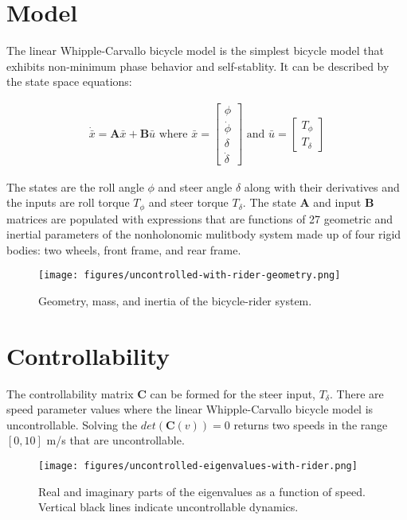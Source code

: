 \documentclass[12pt]{article}
\begin{document}
\section{Model}

The linear Whipple-Carvallo bicycle model
\cite{Whipple1899a,Carvallo1899,Meijaard2007} is the simplest bicycle model
that exhibits non-minimum phase behavior and self-stablity. It can be described
by the state space equations:

\begin{align}
  \dot{\bar{x}} = \mathbf{A} \bar{x} + \mathbf{B} \bar{u}
  \textrm{ where }
  \bar{x} = \begin{bmatrix} \phi \\ \dot{\phi} \\ \delta \\ \dot{\delta} \end{bmatrix}
  \textrm{ and }
  \bar{u} = \begin{bmatrix} T_{\phi} \\ T_{\delta} \end{bmatrix}
\end{align}

The states are the roll angle \(\phi\) and steer angle \(\delta\) along with
their derivatives and the inputs are roll torque \(T_\phi\) and steer torque
\(T_\delta\). The state \(\mathbf{A}\) and input \(\mathbf{B}\) matrices are
populated with expressions that are functions of 27 geometric and inertial
parameters of the nonholonomic mulitbody system made up of four rigid bodies:
two wheels, front frame, and rear frame.

\begin{figure}
  \centering
  \texttt{[image: figures/uncontrolled-with-rider-geometry.png]}
  \caption{Geometry, mass, and inertia of the bicycle-rider system.}
  \label{fig:uncontrolled-with-rider-geometry}
\end{figure}

\section{Controllability}

The controllability matrix \(\mathbf{C}\) can be formed for the steer input,
\(T_\delta\). There are speed parameter values where the linear
Whipple-Carvallo bicycle model is uncontrollable. Solving the
\(det(\mathbf{C}(v))=0\) returns two speeds in the range \([0, 10]\) m/s that
are uncontrollable.

\begin{figure}
  \centering
  \texttt{[image: figures/uncontrolled-eigenvalues-with-rider.png]}
  \caption{Real and imaginary parts of the eigenvalues as a function of speed.
  Vertical black lines indicate uncontrollable dynamics.}
  \label{fig:uncontrolled-eigenvalues-with-rider}
\end{figure}
\end{document}
